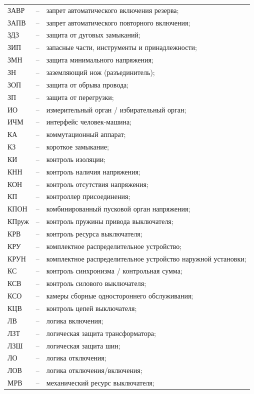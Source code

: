\begin{longtable}{>{\raggedright\arraybackslash}m{2cm}>{\raggedright\arraybackslash}m{0.5cm}>{\raggedright\arraybackslash}m{20cm}}
ЗАВР & -- & запрет автоматического включения резерва; \\
ЗАПВ & -- & запрет автоматического повторного включения; \\
ЗДЗ & -- & защита от дуговых замыканий; \\
ЗИП & -- & запасные части, инструменты и принадлежности; \\
ЗМН & -- & защита минимального напряжения; \\
ЗН & -- & заземляющий нож (разъединитель); \\
ЗОП & -- & защита от обрыва провода; \\
ЗП & -- & защита от перегрузки; \\
ИО & -- & измерительный орган / избирательный орган; \\
ИЧМ & -- & интерфейс человек-машина; \\
КА & -- & коммутационный аппарат; \\
КЗ & -- & короткое замыкание; \\
КИ & -- & контроль изоляции; \\
КНН & -- & контроль наличия напряжения; \\
КОН & -- & контроль отсутствия напряжения; \\
КП & -- & контроллер присоединения; \\
КПОН & -- & комбинированный пусковой орган напряжения; \\
КПруж & -- & контроль пружины привода выключателя; \\
КРВ & -- & контроль ресурса выключателя; \\
КРУ & -- & комплектное распределительное устройство; \\
КРУН & -- & комплектное распределительное устройство наружной установки; \\
КС & -- & контроль синхронизма / контрольная сумма; \\
КСВ & -- & контроль силового выключателя; \\
КСО & -- & камеры сборные одностороннего обслуживания; \\
КЦВ & -- & контроль цепей выключателя; \\
ЛВ & -- & логика включения; \\
ЛЗТ & -- & логическая защита трансформатора; \\
ЛЗШ & -- & логическая защита шин; \\
ЛО & -- & логика отключения; \\
ЛОВ & -- & логика отключения/включения; \\
МРВ & -- & механический ресурс выключателя; \\

\end{longtable}
